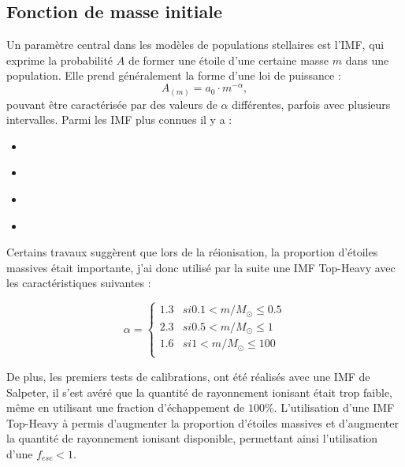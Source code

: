\subsection{Fonction de masse initiale}
\label{sec:imf}

Un paramètre central dans les modèles de populations stellaires est l'\ac{IMF}, qui exprime la probabilité $A$ de former une étoile d'une certaine masse $m$ dans une population.
Elle prend généralement la forme d'une loi de puissance :
\begin{equation}
A_{(m)} = a_0 \cdot m^{-\alpha},
\end{equation}
pouvant être caractérisée par des valeurs de $\alpha$ différentes, parfois avec plusieurs intervalles.
Parmi les \ac{IMF} plus connues il y a :

\begin{itemize}
\item \cite{1955ApJ...121..161S}
\item \cite{1979ApJS...41..513M}
\item \cite{2001MNRAS.322..231K}
\item \cite{2003PASP..115..763C}
\end{itemize}



Certains travaux \citep{2003MNRAS.344L...7C,2013RPPh...76k2901B} suggèrent que lors de la réionisation, la proportion d'étoiles massives était importante, j'ai donc utilisé par la suite une \ac{IMF} Top-Heavy avec les caractéristiques suivantes :

\begin{equation}
	\alpha = 
  	\begin{cases}
	1.3 & si 0.1 < m/M_\odot \leq 0.5\\
	2.3 & si 0.5 < m/M_\odot \leq 1 \\
	1.6 & si 1   < m/M_\odot \leq 100 \\
	\end{cases}
\end{equation} 

De plus, les premiers tests de calibrations, %
ont été réalisés avec une \ac{IMF} de Salpeter, il s'est avéré que la quantité de rayonnement ionisant était trop faible, même en utilisant une fraction d'échappement de $100$\%.
L'utilisation d'une \ac{IMF} Top-Heavy à permis d'augmenter la proportion d'étoiles massives et d'augmenter la quantité de rayonnement ionisant disponible, permettant ainsi l'utilisation d'une $f_{esc}<1$.

